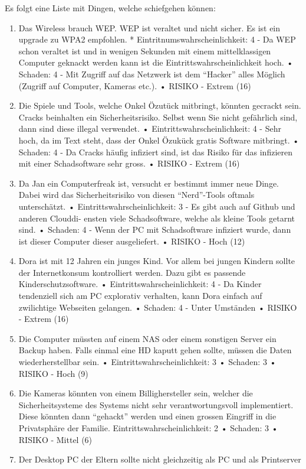 \documentclass{article}
\begin{document}
Es folgt eine Liste mit Dingen, welche schiefgehen können:
\begin{enumerate}
\item Das Wireless brauch WEP. WEP ist veraltet und nicht sicher. Es ist ein upgrade
zu WPA2 empfohlen.
* Eintritnumswahrscheinlichkeit: 4 - Da WEP schon veraltet ist und in wenigen
Sekunden mit einem mittelklassigen Computer geknackt werden kann ist die
Eintrittswahrscheinlichkeit hoch.
• Schaden: 4 - Mit Zugriff auf das Netzwerk ist dem “Hacker” alles Möglich
(Zugriff auf Computer, Kameras etc.).
• RISIKO - Extrem (16)
\item Die Spiele und Tools, welche Onkel Özutück mitbringt, könnten gecrackt sein.
Cracks beinhalten ein Sicherheitsrisiko. Selbst wenn Sie nicht gefährlich sind, dann
sind diese illegal verwendet.
• Eintrittswahrscheinlichkeit: 4 - Sehr hoch, da im Text steht, dass der Onkel
Özukück gratis Software mitbringt.
• Schaden: 4 - Da Cracks häufig infiziert sind, ist das Risiko für das infizieren
mit einer Schadsoftware sehr gross.
• RISIKO - Extrem (16)
\item Da Jan ein Computerfreak ist, versucht er bestimmt immer neue Dinge. Dabei
wird das Sicherheitsrisiko von diesen “Nerd”-Tools oftmals unterschätzt.
• Eintrittswahrscheinlichkeit: 3 - Es gibt auch auf Github und anderen Clouddi-
ensten viele Schadsoftware, welche als kleine Tools getarnt sind.
• Schaden: 4 - Wenn der PC mit Schadsoftware infiziert wurde, dann ist dieser
Computer dieser ausgeliefert.
• RISIKO - Hoch (12)
\item Dora ist mit 12 Jahren ein junges Kind. Vor allem bei jungen Kindern sollte der
Internetkonsum kontrolliert werden. Dazu gibt es passende Kinderschutzsoftware.
• Eintrittswahrscheinlichkeit: 4 - Da Kinder tendenziell sich am PC explorativ
verhalten, kann Dora einfach auf zwilichtige Webseiten gelangen.
• Schaden: 4 - Unter Umständen
• RISIKO - Extrem (16)
\item Die Computer müssten auf einem NAS oder einem sonstigen Server ein Backup
haben. Falls einmal eine HD kaputt gehen sollte, müssen die Daten wiederherstellbar
sein.
• Eintrittswahrscheinlichkeit: 3
• Schaden: 3
• RISIKO - Hoch (9)
\item Die Kameras könnten von einem Billighersteller sein, welcher die Sicherheitsysteme
des Systems nicht sehr verantwortungsvoll implementiert. Diese könnten dann
“gehackt” werden und einen grossen Eingriff in die Privatsphäre der Familie.
Eintrittswahrscheinlichkeit: 2
• Schaden: 3
• RISIKO - Mittel (6)
\item Der Desktop PC der Eltern sollte nicht gleichzeitig als PC und als Printserver

\end{enumerate}
\end{document}
